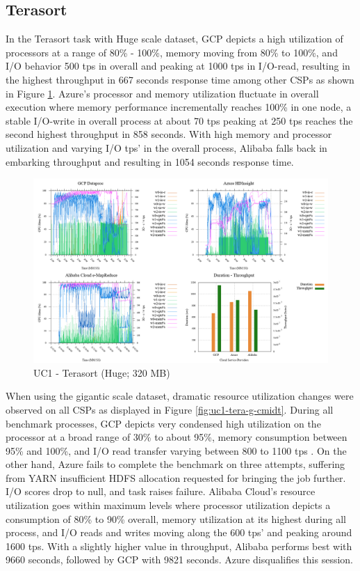 \documentclass[review]{elsarticle}
\begin{document}
\subsection{Terasort}
In the Terasort task with Huge scale dataset, GCP depicts a high utilization of processors at a range of 80\% - 100\%, memory moving from 80\% to 100\%, and I/O behavior 500 tps in overall and peaking at 1000 tps in I/O-read, resulting in the highest throughput in 667 seconds response time among other CSPs as shown in Figure \ref{fig:uc1-tera-h-cmidt}. Azure's processor and memory utilization fluctuate in overall execution where memory performance incrementally reaches 100\% in one node, a stable I/O-write in overall process at about 70 tps peaking at 250 tps reaches the second highest throughput in 858 seconds. With high memory and processor utilization and varying I/O tps' in the overall process, Alibaba falls back in embarking throughput and resulting in 1054 seconds response time.

\begin{figure}[p]
	\caption{UC1 - Terasort (Huge; 320 MB)}
	\label{fig:uc1-tera-h-cmidt}
	\includegraphics[width=\textwidth]{uc1-tera-h-cmidt}
	\centering
\end{figure}

When using the gigantic scale dataset, dramatic resource utilization changes were observed on all CSPs as displayed in Figure \ref{fig:uc1-tera-g-cmidt}. During all benchmark processes, GCP depicts very condensed high utilization on the processor at a broad range of 30\% to about 95\%, memory consumption between 95\% and 100\%, and I/O read transfer varying between 800 to 1100 tps . On the other hand, Azure fails to complete the benchmark on three attempts, suffering from YARN insufficient HDFS allocation requested for bringing the job further. I/O scores drop to null, and task raises failure. Alibaba Cloud's resource utilization goes within maximum levels where processor utilization depicts a consumption of 80\% to 90\% overall, memory utilization at its highest during all process, and I/O reads and writes moving along the 600 tps' and peaking around 1600 tps. With a slightly higher value in throughput, Alibaba performs best with 9660 seconds, followed by GCP with 9821 seconds. Azure disqualifies this session. 
\end{document}
